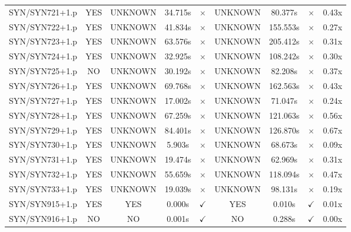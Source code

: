 \documentclass[a4paper,10pt]{article}
\begin{document}
\begin{longtable}{lcccccccc}
SYN/SYN721+1.p & YES & UNKNOWN & 34.715s & \cellcolor{mismatchcolor}$\times$ & UNKNOWN & 80.377s & \cellcolor{mismatchcolor}$\times$ & 0.43x \\
SYN/SYN722+1.p & YES & UNKNOWN & 41.834s & \cellcolor{mismatchcolor}$\times$ & UNKNOWN & 155.553s & \cellcolor{mismatchcolor}$\times$ & 0.27x \\
SYN/SYN723+1.p & YES & UNKNOWN & 63.576s & \cellcolor{mismatchcolor}$\times$ & UNKNOWN & 205.412s & \cellcolor{mismatchcolor}$\times$ & 0.31x \\
SYN/SYN724+1.p & YES & UNKNOWN & 32.925s & \cellcolor{mismatchcolor}$\times$ & UNKNOWN & 108.242s & \cellcolor{mismatchcolor}$\times$ & 0.30x \\
SYN/SYN725+1.p & NO & UNKNOWN & 30.192s & \cellcolor{mismatchcolor}$\times$ & UNKNOWN & 82.208s & \cellcolor{mismatchcolor}$\times$ & 0.37x \\
SYN/SYN726+1.p & YES & UNKNOWN & 69.768s & \cellcolor{mismatchcolor}$\times$ & UNKNOWN & 162.563s & \cellcolor{mismatchcolor}$\times$ & 0.43x \\
SYN/SYN727+1.p & YES & UNKNOWN & 17.002s & \cellcolor{mismatchcolor}$\times$ & UNKNOWN & 71.047s & \cellcolor{mismatchcolor}$\times$ & 0.24x \\
SYN/SYN728+1.p & YES & UNKNOWN & 67.259s & \cellcolor{mismatchcolor}$\times$ & UNKNOWN & 121.063s & \cellcolor{mismatchcolor}$\times$ & 0.56x \\
SYN/SYN729+1.p & YES & UNKNOWN & 84.401s & \cellcolor{mismatchcolor}$\times$ & UNKNOWN & 126.870s & \cellcolor{mismatchcolor}$\times$ & 0.67x \\
SYN/SYN730+1.p & YES & UNKNOWN & 5.903s & \cellcolor{mismatchcolor}$\times$ & UNKNOWN & 68.673s & \cellcolor{mismatchcolor}$\times$ & 0.09x \\
SYN/SYN731+1.p & YES & UNKNOWN & 19.474s & \cellcolor{mismatchcolor}$\times$ & UNKNOWN & 62.969s & \cellcolor{mismatchcolor}$\times$ & 0.31x \\
SYN/SYN732+1.p & YES & UNKNOWN & 55.659s & \cellcolor{mismatchcolor}$\times$ & UNKNOWN & 118.094s & \cellcolor{mismatchcolor}$\times$ & 0.47x \\
SYN/SYN733+1.p & YES & UNKNOWN & 19.039s & \cellcolor{mismatchcolor}$\times$ & UNKNOWN & 98.131s & \cellcolor{mismatchcolor}$\times$ & 0.19x \\
SYN/SYN915+1.p & YES & YES & 0.000s & \cellcolor{matchcolor}$\checkmark$ & YES & 0.010s & \cellcolor{matchcolor}$\checkmark$ & 0.01x \\
SYN/SYN916+1.p & NO & NO & 0.001s & \cellcolor{matchcolor}$\checkmark$ & NO & 0.288s & \cellcolor{matchcolor}$\checkmark$ & 0.00x \\

\end{longtable}
\end{document}
